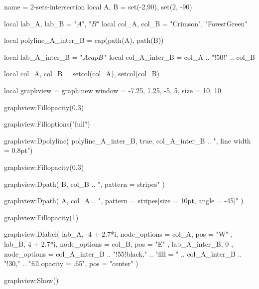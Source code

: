 \documentclass{standalone}
\begin{document}
\begin{luadraw}{name = 2-sets-intersection}
  local A, B = set(-2,90), set(2, -90)

  local lab_A, lab_B = "$A$", "$B$"
  local col_A, col_B = "Crimson", "ForestGreen"

  local polyline_A_inter_B = cap(path(A), path(B))

  local lab_A_inter_B = "$A \\cap B$"
  local col_A_inter_B = col_A .. "!50!" .. col_B

  local col_A, col_B = setcol(col_A), setcol(col_B)

  local graphview = graph:new{
    window = {-7.25, 7.25, -5, 5},
    size   = {10, 10}
  }

  graphview:Fillopacity(0.3)

  graphview:Filloptions("full")

  graphview:Dpolyline(
    polyline_A_inter_B,
    true,
    col_A_inter_B .. ", line width = 0.8pt")

  graphview:Fillopacity(0.3)

  graphview:Dpath(
    B,
    col_B .. ", pattern = stripes"
  )

  graphview:Dpath(
    A,
    col_A .. ", pattern = {stripes[size = 10pt, angle = -45]}"
  )

  graphview:Fillopacity(1)

  graphview:Dlabel(
    lab_A, -4 + 2.7*i, {
      node_options = col_A,
      pos = "W"
    },
    lab_B, 4 + 2.7*i, {
      node_options = col_B,
      pos = "E"
    },
    lab_A_inter_B, 0 , {
      node_options = col_A_inter_B .. "!55!black,"
                  .. "fill = " .. col_A_inter_B .. "!30,"
                  .. "fill opacity = .65",
      pos = "center"
     })

  graphview:Show()
\end{luadraw}
\end{document}
